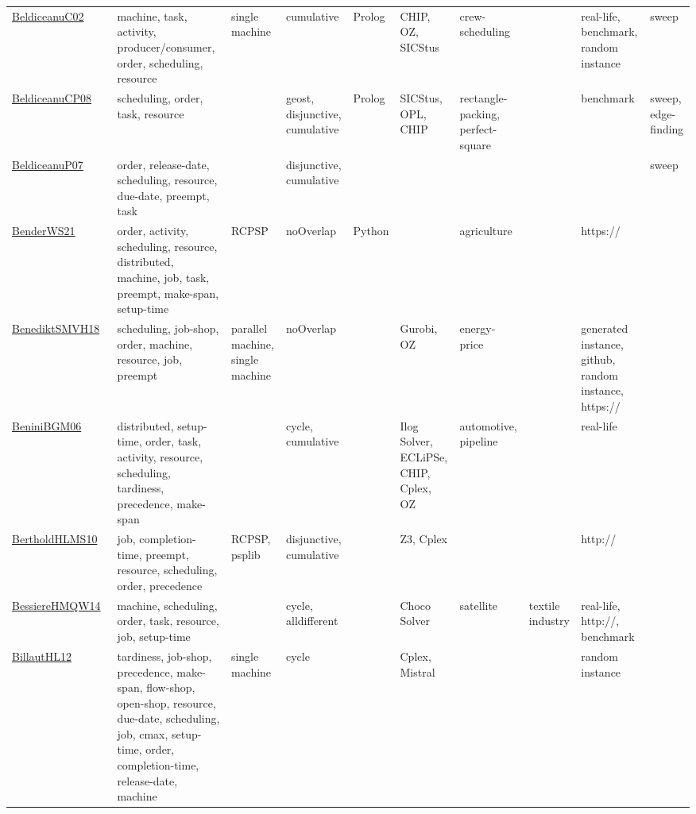 {\begin{longtable}{p{3cm}p{4cm}p{2cm}p{2cm}p{2cm}p{2cm}p{2cm}p{2cm}p{2cm}p{2cm}}
\href{papers/BeldiceanuC02.pdf}{BeldiceanuC02}~\cite{BeldiceanuC02} & machine, task, activity, producer/consumer, order, scheduling, resource & single machine & cumulative & Prolog & CHIP, OZ, SICStus & crew-scheduling &  & real-life, benchmark, random instance & sweep\\
\href{papers/BeldiceanuCP08.pdf}{BeldiceanuCP08}~\cite{BeldiceanuCP08} & scheduling, order, task, resource &  & geost, disjunctive, cumulative & Prolog & SICStus, OPL, CHIP & rectangle-packing, perfect-square &  & benchmark & sweep, edge-finding\\
\href{papers/BeldiceanuP07.pdf}{BeldiceanuP07}~\cite{BeldiceanuP07} & order, release-date, scheduling, resource, due-date, preempt, task &  & disjunctive, cumulative &  &  &  &  &  & sweep\\
\href{papers/BenderWS21.pdf}{BenderWS21}~\cite{BenderWS21} & order, activity, scheduling, resource, distributed, machine, job, task, preempt, make-span, setup-time & RCPSP & noOverlap & Python &  & agriculture &  & https:// & \\
\href{papers/BenediktSMVH18.pdf}{BenediktSMVH18}~\cite{BenediktSMVH18} & scheduling, job-shop, order, machine, resource, job, preempt & parallel machine, single machine & noOverlap &  & Gurobi, OZ & energy-price &  & generated instance, github, random instance, https:// & \\
\href{papers/BeniniBGM06.pdf}{BeniniBGM06}~\cite{BeniniBGM06} & distributed, setup-time, order, task, activity, resource, scheduling, tardiness, precedence, make-span &  & cycle, cumulative &  & Ilog Solver, ECLiPSe, CHIP, Cplex, OZ & automotive, pipeline &  & real-life & \\
\href{papers/BertholdHLMS10.pdf}{BertholdHLMS10}~\cite{BertholdHLMS10} & job, completion-time, preempt, resource, scheduling, order, precedence & RCPSP, psplib & disjunctive, cumulative &  & Z3, Cplex &  &  & http:// & \\
\href{papers/BessiereHMQW14.pdf}{BessiereHMQW14}~\cite{BessiereHMQW14} & machine, scheduling, order, task, resource, job, setup-time &  & cycle, alldifferent &  & Choco Solver & satellite & textile industry & real-life, http://, benchmark & \\
\href{papers/BillautHL12.pdf}{BillautHL12}~\cite{BillautHL12} & tardiness, job-shop, precedence, make-span, flow-shop, open-shop, resource, due-date, scheduling, job, cmax, setup-time, order, completion-time, release-date, machine & single machine & cycle &  & Cplex, Mistral &  &  & random instance & \\

\end{longtable}}
